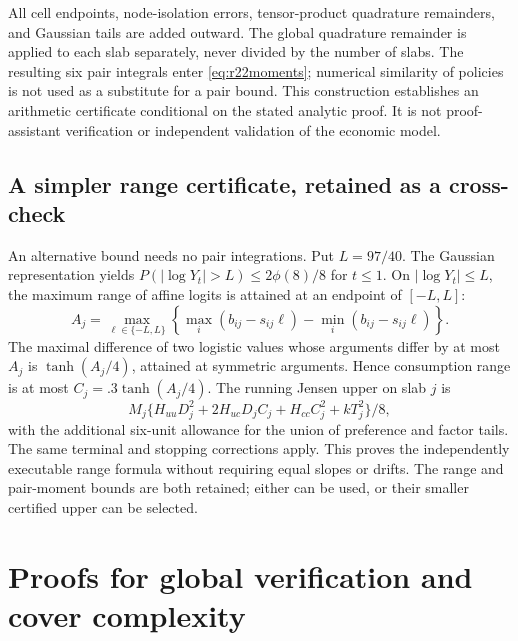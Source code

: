 All cell endpoints, node-isolation errors, tensor-product quadrature remainders, and Gaussian tails are added outward. The global quadrature remainder is applied to each slab separately, never divided by the number of slabs. The resulting six pair integrals enter \eqref{eq:r22moments}; numerical similarity of policies is not used as a substitute for a pair bound. This construction establishes an arithmetic certificate conditional on the stated analytic proof. It is not proof-assistant verification or independent validation of the economic model.

\subsection{A simpler range certificate, retained as a cross-check}
An alternative bound needs no pair integrations. Put $L=97/40$. The Gaussian representation yields $P(|\log Y_t|>L)\leq2\phi(8)/8$ for $t\leq1$. On $|\log Y_t|\leq L$, the maximum range of affine logits is attained at an endpoint of $[-L,L]$:
\[
 A_j=\max_{\ell\in\{-L,L\}}\left\{\max_i(b_{ij}-s_{ij}\ell)-\min_i(b_{ij}-s_{ij}\ell)\right\}.
\]
The maximal difference of two logistic values whose arguments differ by at most $A_j$ is $\tanh(A_j/4)$, attained at symmetric arguments. Hence consumption range is at most $C_j=.3\tanh(A_j/4)$. The running Jensen upper on slab $j$ is
\[
 M_j\{H_{uu}D_j^2+2H_{uc}D_jC_j+H_{cc}C_j^2+kT_j^2\}/8,
\]
with the additional six-unit allowance for the union of preference and factor tails. The same terminal and stopping corrections apply. This proves the independently executable range formula without requiring equal slopes or drifts. The range and pair-moment bounds are both retained; either can be used, or their smaller certified upper can be selected.

\section{Proofs for global verification and cover complexity}\label{app:r22global}
